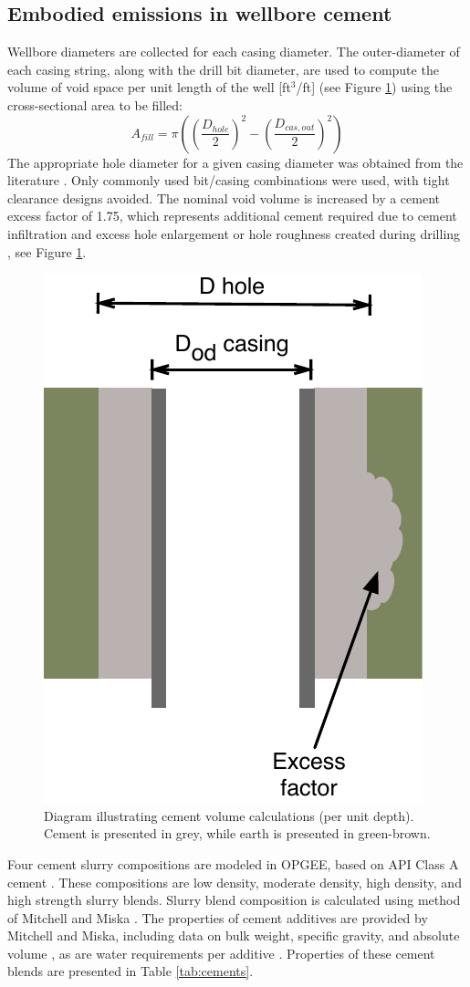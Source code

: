 \documentclass[11pt]{report}
\newcommand{\marg}[1]{{\footnotesize\textit{\textcolor{stanford}{'#1'}}}}
\newcommand{\marginnote}[1]{\marginpar{\marg{#1}}}
\begin{document}
{{{{\subsection{Embodied emissions in wellbore cement}

Wellbore \marginnote{Embodied Emissions 2.2.1} diameters are collected for each casing diameter. The outer-diameter of each casing string, along with the drill bit diameter, are used to compute the volume of void space per unit length of the well [ft$^3$/ft] (see Figure \ref{fig:cement_volume}) using the cross-sectional area to be filled:
\begin{equation}
A_{fill} = \pi\left(\left(\frac{D_{hole}}{2}\right)^2-\left(\frac{D_{cas,out}}{2}\right)^2\right)
\end{equation}
The appropriate hole diameter \marginnote{Embodied Emissions 2.2.1} for a given casing diameter was obtained from the literature \cite[Figure 7.18]{Mitchell2011}. Only commonly used bit/casing combinations were used, with tight clearance designs avoided. The nominal void volume is increased by a cement excess factor of 1.75, which represents additional cement required due to cement infiltration and excess hole enlargement or hole roughness created during drilling \cite[Example 4.5]{Mitchell2011}, see Figure \ref{fig:cement_volume}. 

\begin{figure}[t]
\includegraphics[width=0.35\columnwidth]{images/cementing_volume.pdf}
\caption{Diagram illustrating cement volume calculations (per unit depth). Cement is presented in grey, while earth is presented in green-brown.}
\label{fig:cement_volume}
\end{figure}

Four cement slurry compositions are modeled in OPGEE, \marginnote{Embodied Emissions 2.4.1} based on API Class A cement \cite[Table 4.2]{Mitchell2011}. These compositions are low density, moderate density, high density, and high strength slurry blends. Slurry blend composition is calculated using method of Mitchell and Miska \cite[Examples 4.3, 4.4, 4.5]{Mitchell2011}. The properties of cement additives are provided by Mitchell and Miska, including data on bulk weight, specific gravity, and absolute volume \cite[Table 4.4]{Mitchell2011}, as are water requirements per additive \cite[Table 4.5]{Mitchell2011}. Properties of these cement blends are presented in Table \ref{tab:cements}.

}}}}
\end{document}
